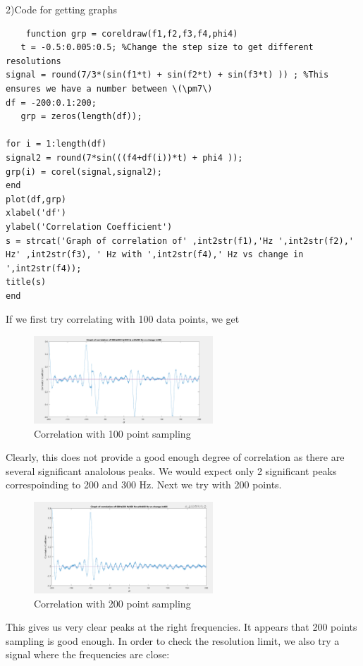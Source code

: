 2)Code for getting graphs
\begin{lstlisting}
    function grp = coreldraw(f1,f2,f3,f4,phi4)
   t = -0.5:0.005:0.5; %Change the step size to get different resolutions
signal = round(7/3*(sin(f1*t) + sin(f2*t) + sin(f3*t) )) ; %This ensures we have a number between \(\pm7\)
df = -200:0.1:200;
   grp = zeros(length(df));

for i = 1:length(df)
signal2 = round(7*sin(((f4+df(i))*t) + phi4 ));
grp(i) = corel(signal,signal2);
end
plot(df,grp)
xlabel('df')
ylabel('Correlation Coefficient')
s = strcat('Graph of correlation of' ,int2str(f1),'Hz ',int2str(f2),' Hz' ,int2str(f3), ' Hz with ',int2str(f4),' Hz vs change in ',int2str(f4));
title(s)
end
\end{lstlisting}
If we first try correlating with 100 data points, we get 
\begin{figure}[ht]
    \centering
    \includegraphics[width=0.6\textwidth]{fig/Graph2100pts.PNG}
    \caption{Correlation with 100 point sampling}
    \label{fig:100pts}
\end{figure}
Clearly, this does not provide a good enough degree of correlation as there are several significant analolous peaks. We would expect only 2 significant peaks correspoinding to 200 and 300 Hz. Next we try with 200 points. 
\begin{figure}[ht]
    \centering
    \includegraphics[width=0.6\textwidth]{fig/Graph1.PNG}
    \caption{Correlation with 200 point sampling}
    \label{fig:100pts}
\end{figure}
This gives us very clear peaks at the right frequencies. It appears that 200 points sampling is good enough. In order to check the resolution limit, we also try a signal where the frequencies are close: 
